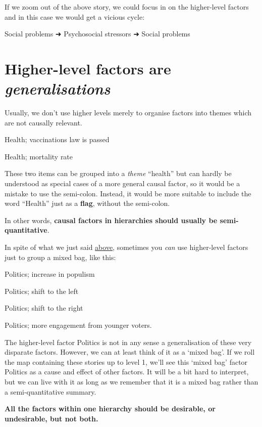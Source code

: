 \documentclass[
]{book}
\begin{document}
If we zoom out of the above story, we could focus in on the higher-level factors and in this case we would get a vicious cycle:

Social problems ➜ Psychosocial stressors ➜ Social problems

\hypertarget{higher-level-factors-are-generalisations}{%
\section{\texorpdfstring{Higher-level factors are \emph{generalisations}}{Higher-level factors are generalisations}}\label{higher-level-factors-are-generalisations}}

Usually, we don't use higher levels merely to organise factors into themes which are not causally relevant.

Health; vaccinations law is passed

Health; mortality rate

These two items can be grouped into a \emph{theme} ``health'' but can hardly be understood as special cases of a more general causal factor, so it would be a mistake to use the semi-colon. Instead, it would be more suitable to include the word ``Health'' just as a \textbf{flag}, without the semi-colon.

In other words, \textbf{causal factors in hierarchies should usually be semi-quantitative}.

In spite of what we just said \protect\hyperlink{higher-level-factors-are-generalisations}{above}, sometimes you \emph{can} use higher-level factors just to group a mixed bag, like this:

Politics; increase in populism

Politics; shift to the left

Politics; shift to the right

Politics; more engagement from younger voters.

The higher-level factor Politics is not in any sense a generalisation of these very disparate factors. However, we can at least think of it as a `mixed bag'. If we roll the map containing these stories up to level 1, we'll see this `mixed bag' factor Politics as a cause and effect of other factors. It will be a bit hard to interpret, but we can live with it as long as we remember that it is a mixed bag rather than a semi-quantitative summary.

\textbf{All the factors within one hierarchy should be desirable, or undesirable, but not both.}
\end{document}
